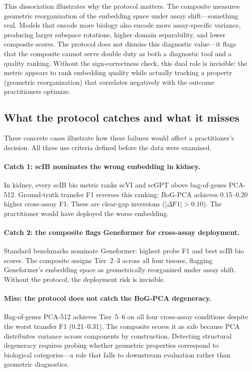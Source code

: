 \documentclass[10pt,letterpaper]{article}
\begin{document}
This dissociation illustrates why the protocol matters. The composite measures geometric reorganization of the embedding space under assay shift---something real. Models that encode more biology also encode more assay-specific variance, producing larger subspace rotations, higher domain separability, and lower composite scores. The protocol does not dismiss this diagnostic value---it flags that the composite cannot serve double duty as both a diagnostic tool and a quality ranking. Without the sign-correctness check, this dual role is invisible: the metric appears to rank embedding quality while actually tracking a property (geometric reorganization) that correlates negatively with the outcome practitioners optimize.


\subsection{What the protocol catches and what it misses}

Three concrete cases illustrate how these failures would affect a practitioner's decision. All three use criteria defined before the data were examined.

\paragraph{Catch 1: scIB nominates the wrong embedding in kidney.} In kidney, every scIB bio metric ranks scVI and scGPT above bag-of-genes PCA-512. Ground-truth transfer F1 reverses this ranking: BoG-PCA achieves 0.15--0.20 higher cross-assay F1. These are clear-gap inversions ($|\Delta\text{F1}| > 0.10$). The practitioner would have deployed the worse embedding.

\paragraph{Catch 2: the composite flags Geneformer for cross-assay deployment.} Standard benchmarks nominate Geneformer: highest probe F1 and best scIB bio scores. The composite assigns Tier~2--3 across all four tissues, flagging Geneformer's embedding space as geometrically reorganized under assay shift. Without the protocol, the deployment risk is invisible.

\paragraph{Miss: the protocol does not catch the BoG-PCA degeneracy.} Bag-of-genes PCA-512 achieves Tier~5--6 on all four cross-assay conditions despite the worst transfer F1 (0.21--0.31). The composite scores it as safe because PCA distributes variance across components by construction. Detecting structural degeneracy requires probing whether geometric properties correspond to biological categories---a role that falls to downstream evaluation rather than geometric diagnostics.
\end{document}
